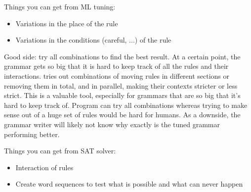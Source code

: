 Things you can get from ML tuning:
\begin{itemize}
\item Variations in the place of the rule
\item Variations in the conditions (careful, ...) of the rule
\end{itemize}
Good side: try all combinations to find the best result. 
At a certain point, the grammar gets so big that it is hard to keep track of all the rules and their interactions. \cite{bick2013tuning} tries out combinations of moving rules in different sections or removing them in total, and in parallel, making their contexts stricter or less strict. 
This is a valuable tool, especially for grammars that are so big that it's hard to keep track of. Program can try all combinations whereas trying to make sense out of a huge set of rules would be hard for humans.
As a downside, the grammar writer will likely not know why exactly is the tuned grammar performing better.


Things you can get from SAT solver:
\begin{itemize}
\item Interaction of rules
\item Create word sequences to test what is possible and what can never happen
\end{itemize}











